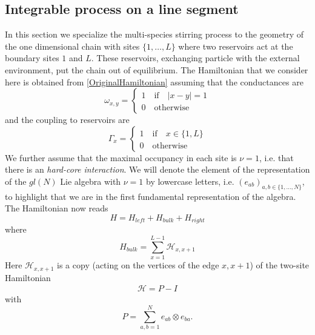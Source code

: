 \documentclass[10pt]{article}
\numberwithin{equation}{section}
\numberwithin{equation}{subsection}
\newcommand{\id}{I}
\begin{document}
\subsection{Integrable process on a line segment}\label{subsection-description-process-LINE}
In this section we specialize the multi-species stirring process to the geometry of the one dimensional chain with sites $\{1,\ldots,L\}$ where two reservoirs act at the boundary sites $1$ and $L$. These reservoirs, exchanging particle with the external environment, put the chain out of equilibrium. The Hamiltonian that we consider here is obtained from \eqref{OriginalHamiltonian} assuming that the conductances are
\begin{equation}
	\omega_{x,y}=\begin{cases}
		1 \quad \text{if}\quad |x-y|=1\\
		0\quad \text{otherwise}
	\end{cases}
\end{equation}
and the coupling to reservoirs are
\begin{equation}
	\Gamma_{x}=\begin{cases}
		1\quad \text{if} \quad x\in \{1,L\}\\
		0\quad \text{otherwise}
	\end{cases}
\end{equation}
We further assume that the maximal occupancy in each site is $\nu=1$, i.e. that there is an \textit{hard-core interaction}.
We will denote the element of the representation of the $gl(N)$  Lie algebra with $\nu=1$ by lowercase letters, i.e. $(e_{ab})_{a,b\in\{1,\ldots,N\}}$, to highlight that we are in the first fundamental representation of the algebra.
The Hamiltonian now reads
\begin{equation}\label{hamiltonian}
	H=H_{left}+H_{bulk}+H_{right}
\end{equation}
where
\begin{equation}
	H_{bulk}=\sum_{x=1}^{L-1}\mathcal{H}_{x,x+1}
\end{equation}
Here $\mathcal{H}_{x,x+1}$  is a copy (acting on the vertices of the edge $x,x+1$) of the two-site Hamiltonian
\begin{equation}\label{H-corsivo}
	\begin{split}
		\mathcal{H}=P-\id
	\end{split}
\end{equation}
with 
\begin{equation}
	P=\sum_{a,b=1}^Ne_{ab}\otimes e_{ba}.
\end{equation} 
\end{document}
